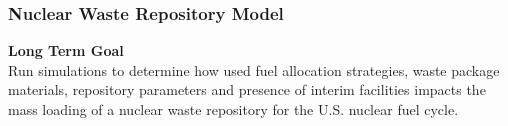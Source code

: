 \begin{frame}
    \frametitle{Nuclear Waste Repository Model}
        \textbf{Long Term Goal}
        \\
        
        Run simulations to determine how used fuel allocation strategies, waste package materials, repository parameters and presence of interim facilities impacts the mass loading of a nuclear waste repository for the U.S. nuclear fuel cycle. 
\end{frame}
  